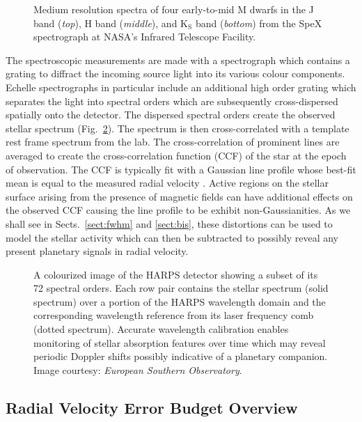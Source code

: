 \begin{figure}
\centering
\caption{Medium resolution spectra of four early-to-mid M dwarfs in the J band (\emph{top}),
  H band (\emph{middle}), and K$_{\text{S}}$ band (\emph{bottom}) from the SpeX spectrograph
  at NASA's Infrared Telescope Facility. \label{fig:spectra}}
\end{figure}

The spectroscopic measurements are made with a spectrograph which contains a grating to 
diffract the incoming source light into its various colour components. Echelle spectrographs
in particular include an additional high order grating which separates the light into
spectral orders which are subsequently cross-dispersed spatially onto the detector. The dispersed
spectral orders create the observed stellar spectrum (Fig.~\ref{fig:harps}).
The spectrum is then cross-correlated with a  
template rest frame spectrum from the lab. The cross-correlation of prominent lines 
are averaged to create the cross-correlation function (CCF) of the star at the epoch of 
observation. The CCF is typically fit with a Gaussian line profile whose best-fit mean 
is equal to the measured radial velocity \citep{pepe02}. 
Active regions on the stellar surface arising 
from the presence of magnetic fields can have additional effects on the observed CCF 
causing the line profile to be exhibit non-Gaussianities. 
As we shall see in Sects.~\ref{sect:fwhm} and \ref{sect:bis}, these distortions can 
be used to model the stellar activity which can then be subtracted to possibly reveal 
any present planetary signals in radial velocity.

\begin{figure}
  \centering
  \caption{A colourized image of the HARPS detector showing a subset of its 72 spectral orders.
    Each row pair contains the stellar spectrum (solid spectrum) over a portion of the HARPS wavelength
    domain and the corresponding wavelength reference from its laser frequency comb (dotted spectrum).
    Accurate wavelength calibration enables monitoring of stellar absorption features over time which
    may reveal periodic Doppler shifts possibly indicative of a planetary companion.
    Image courtesy: \emph{European Southern Observatory}.}
  \label{fig:harps}
\end{figure}

\subsection{Radial Velocity Error Budget Overview}

